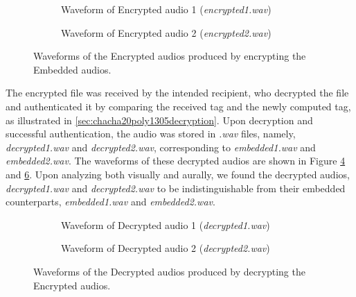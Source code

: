 \documentclass[a4paper]{cas-sc}
\begin{document}
\begin{figure}[pos=h]
    \begin{subfigure}[h]{0.45\textwidth}
        \begin{center}
            
            \caption{Waveform of Encrypted audio 1 (\textit{encrypted1.wav})}
            \label{fig:encrypted1}
        \end{center}
    \end{subfigure}
    \hfill
    \begin{subfigure}[h]{0.45\textwidth}
        \begin{center}
            
            \caption{Waveform of Encrypted audio 2 (\textit{encrypted2.wav})}
            \label{fig:encrypted2}
        \end{center}
    \end{subfigure}
    \caption{Waveforms of the Encrypted audios produced by encrypting the Embedded audios.}
\end{figure}

The encrypted file was received by the intended recipient, who decrypted the file and authenticated it by comparing the received tag and the newly computed tag, as illustrated in \ref{sec:chacha20poly1305decryption}. Upon decryption and successful authentication, the audio was stored in \textit{.wav} files, namely, \textit{decrypted1.wav} and \textit{decrypted2.wav}, corresponding to \textit{embedded1.wav} and \textit{embedded2.wav}. The waveforms of these decrypted audios are shown in Figure \ref{fig:decrypted1} and \ref{fig:decrypted2}. Upon analyzing both visually and aurally, we found the decrypted audios, \textit{decrypted1.wav} and \textit{decrypted2.wav} to be indistinguishable from their embedded counterparts, \textit{embedded1.wav} and \textit{embedded2.wav}.

\begin{figure}[pos=h]
    \begin{subfigure}[h]{0.45\textwidth}
        \begin{center}
            
            \caption{Waveform of Decrypted audio 1 (\textit{decrypted1.wav})}
            \label{fig:decrypted1}
        \end{center}
    \end{subfigure}
    \hfill
    \begin{subfigure}[h]{0.45\textwidth}
        \begin{center}
            
            \caption{Waveform of Decrypted audio 2 (\textit{decrypted2.wav})}
            \label{fig:decrypted2}
        \end{center}
    \end{subfigure}
    \caption{Waveforms of the Decrypted audios produced by decrypting the Encrypted audios.}
\end{figure}
\end{document}
